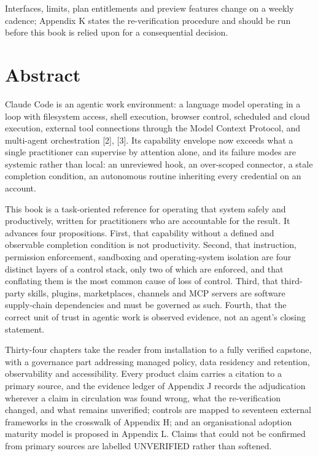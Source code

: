 \documentclass[11pt,a4paper,twoside,openany]{book}
\newcommand{\breakrule}{\par\addvspace{3mm}\noindent
  \hspace*{\fill}{\color{brass}\rule{18mm}{0.5mm}}\hspace*{\fill}\par\addvspace{3mm}}
\begin{document}
Interfaces, limits, plan entitlements and preview features change on a weekly cadence; Appendix K states the re-verification procedure and should be run before this book is relied upon for a consequential decision.


\breakrule

\FloatBarrier
\section*{Abstract}

Claude Code is an agentic work environment: a language model operating in a loop with filesystem access, shell execution, browser control, scheduled and cloud execution, external tool connections through the Model Context Protocol, and multi-agent orchestration [2], [3]. Its capability envelope now exceeds what a single practitioner can supervise by attention alone, and its failure modes are systemic rather than local: an unreviewed hook, an over-scoped connector, a stale completion condition, an autonomous routine inheriting every credential on an account.


This book is a task-oriented reference for operating that system safely and productively, written for practitioners who are accountable for the result. It advances four propositions. First, that capability without a defined and observable completion condition is not productivity. Second, that instruction, permission enforcement, sandboxing and operating-system isolation are four distinct layers of a control stack, only two of which are enforced, and that conflating them is the most common cause of loss of control. Third, that third-party skills, plugins, marketplaces, channels and MCP servers are software supply-chain dependencies and must be governed as such. Fourth, that the correct unit of trust in agentic work is observed evidence, not an agent's closing statement.


Thirty-four chapters take the reader from installation to a fully verified capstone, with a governance part addressing managed policy, data residency and retention, observability and accessibility. Every product claim carries a citation to a primary source, and the evidence ledger of Appendix J records the adjudication wherever a claim in circulation was found wrong, what the re-verification changed, and what remains unverified; controls are mapped to seventeen external frameworks in the crosswalk of Appendix H; and an organisational adoption maturity model is proposed in Appendix L. Claims that could not be confirmed from primary sources are labelled UNVERIFIED rather than softened.
\end{document}
